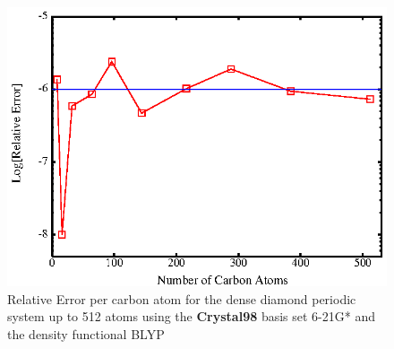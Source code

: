 \commentoutA{\documentclass[prb,aps,twocolumn,showpacs,twocolumngrid,superbib]{revtex4}}
\begin{document}
\begin{figure}

\caption{\label{figure:ErrorPerN} Relative Error per carbon atom for the dense diamond
periodic system up to 512 atoms using the {\bf Crystal98} basis set 6-21G* \cite{C98Basis} and the 
density functional BLYP \cite{Becke93}}

{\centering \includegraphics{ErrorVsNumber_Diamond512.ps} \par} 
\end{figure}
\end{document}
